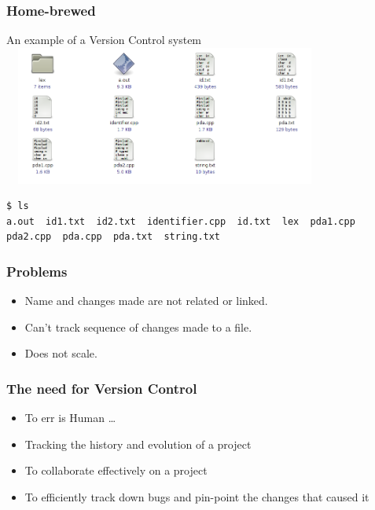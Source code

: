 \documentclass[14pt,compress]{beamer}
\begin{document}
\begin{frame}[fragile]
  \frametitle{Home-brewed}
  \begin{center}
    An example of a  Version Control system
    \includegraphics[height=1.8in,width=4.2in]{images/folder.png}
  \end{center}
  \begin{lstlisting} 
$ ls
a.out  id1.txt  id2.txt  identifier.cpp  id.txt  lex  pda1.cpp  pda2.cpp  pda.cpp  pda.txt  string.txt
  \end{lstlisting} %
\end{frame}

\begin{frame}[fragile]
  \frametitle{Problems}  
  \begin{block}{}    
  \begin{itemize}
  \item Name and changes made are not related or linked. 
  \item Can't track sequence of changes made to a file. 
  \item Does not scale. 
  \end{itemize}
    \end{block}
\end{frame}

\begin{frame}[fragile]
  \frametitle{The need for Version Control}
  \begin{itemize}
  \item \alert{To err is Human} \ldots 
  \item Tracking the history and evolution of a project
  \item To collaborate effectively on a project
  \item To efficiently track down bugs and pin-point the changes that
    caused it 
  \end{itemize}
\end{frame}
\end{document}
